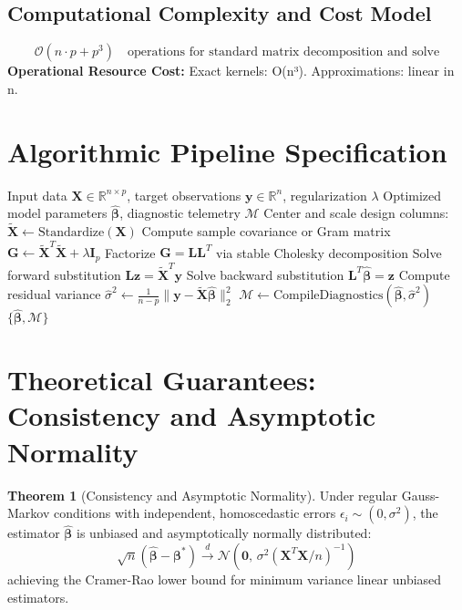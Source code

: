 \documentclass[11pt,a4paper]{article}
\theoremstyle{definition}
\newtheorem{theorem}{\textbf{Theorem}}[section]
\begin{document}
\subsection{Computational Complexity and Cost Model}
\begin{equation}
\mathcal{O}(n \cdot p + p^3) \quad \text{operations for standard matrix decomposition and solve}
\end{equation}
\textbf{Operational Resource Cost:} Exact kernels: O(n³). Approximations: linear in n.

\section{Algorithmic Pipeline Specification}

\begin{algorithm}[H]
\caption{Kernel methods and random Fourier features Execution}
\begin{algorithmic}[1]
\Require Input data $\mathbf{X} \in \mathbb{R}^{n \times p}$, target observations $\mathbf{y} \in \mathbb{R}^n$, regularization $\lambda$
\Ensure Optimized model parameters $\hat{\boldsymbol{\beta}}$, diagnostic telemetry $\mathcal{M}$
\State Center and scale design columns: $\tilde{\mathbf{X}} \gets \text{Standardize}(\mathbf{X})$
\State Compute sample covariance or Gram matrix $\mathbf{G} \gets \tilde{\mathbf{X}}^T \tilde{\mathbf{X}} + \lambda \mathbf{I}_p$
\State Factorize $\mathbf{G} = \mathbf{L} \mathbf{L}^T$ via stable Cholesky decomposition
\State Solve forward substitution $\mathbf{L} \mathbf{z} = \tilde{\mathbf{X}}^T \mathbf{y}$
\State Solve backward substitution $\mathbf{L}^T \hat{\boldsymbol{\beta}} = \mathbf{z}$
\State Compute residual variance $\hat{\sigma}^2 \gets \frac{1}{n - p} \| \mathbf{y} - \tilde{\mathbf{X}} \hat{\boldsymbol{\beta}} \|_2^2$
\State $\mathcal{M} \gets \text{CompileDiagnostics}(\hat{\boldsymbol{\beta}}, \hat{\sigma}^2)$
\State \Return $\{\hat{\boldsymbol{\beta}}, \mathcal{M}\}$
\end{algorithmic}
\end{algorithm}

\section{Theoretical Guarantees: Consistency and Asymptotic Normality}

\begin{theorem}[Consistency and Asymptotic Normality]
Under regular Gauss-Markov conditions with independent, homoscedastic errors $\epsilon_i \sim (0, \sigma^2)$, the estimator $\hat{\boldsymbol{\beta}}$ is unbiased and asymptotically normally distributed:
\begin{equation}
\sqrt{n}(\hat{\boldsymbol{\beta}} - \boldsymbol{\beta}^*) \xrightarrow{d} \mathcal{N}\left(\mathbf{0}, \, \sigma^2 (\mathbf{X}^T \mathbf{X} / n)^{-1}\right)
\end{equation}
achieving the Cramer-Rao lower bound for minimum variance linear unbiased estimators.
\end{theorem}
\end{document}
